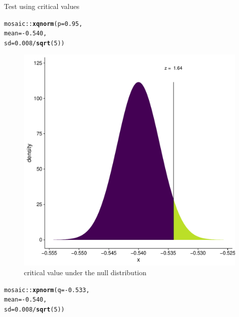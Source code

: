 \documentclass[10pt,handout]{beamer}\usepackage[]{graphicx}\usepackage[]{color}
\makeatletter
\def\maxwidth{ %
  \ifdim\Gin@nat@width>\linewidth
    \linewidth
  \else
    \Gin@nat@width
  \fi
}
\newcommand{\hlnum}[1]{\textcolor[rgb]{0.686,0.059,0.569}{#1}}%
\newcommand{\hlopt}[1]{\textcolor[rgb]{0,0,0}{#1}}%
\newcommand{\hlstd}[1]{\textcolor[rgb]{0.345,0.345,0.345}{#1}}%
\newcommand{\hlkwc}[1]{\textcolor[rgb]{0.333,0.667,0.333}{#1}}%
\newcommand{\hlkwd}[1]{\textcolor[rgb]{0.737,0.353,0.396}{\textbf{#1}}}%
\newenvironment{kframe}{%
 \def\at@end@of@kframe{}%
 \ifinner\ifhmode%
  \def\at@end@of@kframe{\end{minipage}}%
  \begin{minipage}{\columnwidth}%
 \fi\fi%
 \def\FrameCommand##1{\hskip\@totalleftmargin \hskip-\fboxsep
 \colorbox{shadecolor}{##1}\hskip-\fboxsep
     \hskip-\linewidth \hskip-\@totalleftmargin \hskip\columnwidth}%
 \MakeFramed {\advance\hsize-\width
   \@totalleftmargin\z@ \linewidth\hsize
   \@setminipage}}%
 {\par\unskip\endMakeFramed%
 \at@end@of@kframe}
\newenvironment{knitrout}{}{} %
\makeatother
\begin{document}
\begin{frame}[fragile]{Test using critical values}
	
	
	\begin{minipage}{0.47\textwidth}
\begin{knitrout}\tiny
{}\color{fgcolor}\begin{kframe}
\begin{alltt}
\hlstd{mosaic}\hlopt{::}\hlkwd{xqnorm}\hlstd{(}\hlkwc{p} \hlstd{=} \hlnum{0.95}\hlstd{,}
\hlkwc{mean} \hlstd{=} \hlopt{-}\hlnum{0.540}\hlstd{,}
\hlkwc{sd} \hlstd{=} \hlnum{0.008}\hlopt{/}\hlkwd{sqrt}\hlstd{(}\hlnum{5}\hlstd{))}
\end{alltt}
\end{kframe}\begin{figure}

{\centering \includegraphics[width=\maxwidth]{figure/unnamed-chunk-5-1} 

}

\caption[critical value under the null distribution]{critical value under the null distribution}\label{fig:unnamed-chunk-5}
\end{figure}

\end{knitrout}
	\end{minipage}
	\begin{minipage}{0.47\textwidth}
\begin{knitrout}\tiny
{}\color{fgcolor}\begin{kframe}
\begin{alltt}
\hlstd{mosaic}\hlopt{::}\hlkwd{xpnorm}\hlstd{(}\hlkwc{q} \hlstd{=} \hlopt{-}\hlnum{0.533}\hlstd{,}
\hlkwc{mean} \hlstd{=} \hlopt{-}\hlnum{0.540}\hlstd{,}
\hlkwc{sd} \hlstd{=} \hlnum{0.008}\hlopt{/}\hlkwd{sqrt}\hlstd{(}\hlnum{5}\hlstd{))}
\end{alltt}
\end{kframe}\begin{figure}


\end{figure}
\end{knitrout}
\end{minipage}
\end{frame}
\end{document}
